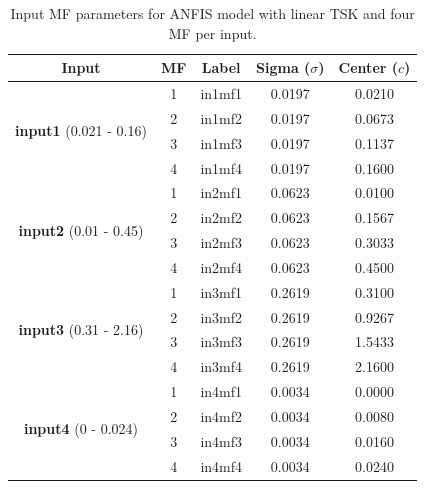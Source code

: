 \documentclass[12pt]{article}
\begin{document}
\begin{table}[H]
\centering
\begin{tabular}{|c|c|c|c|c|}
\hline
\textbf{Input} & \textbf{MF} & \textbf{Label} & \textbf{Sigma ($\sigma$)} & \textbf{Center ($c$)} \\ \hline
\multirow{4}{*}{\textbf{input1} (0.021 - 0.16)} 
 & 1 & in1mf1 & 0.0197 & 0.0210 \\ \cline{2-5} 
 & 2 & in1mf2 & 0.0197 & 0.0673 \\ \cline{2-5} 
 & 3 & in1mf3 & 0.0197 & 0.1137 \\ \cline{2-5} 
 & 4 & in1mf4 & 0.0197 & 0.1600 \\ \hline
\hline
\multirow{4}{*}{\textbf{input2} (0.01 - 0.45)} 
 & 1 & in2mf1 & 0.0623 & 0.0100 \\ \cline{2-5} 
 & 2 & in2mf2 & 0.0623 & 0.1567 \\ \cline{2-5} 
 & 3 & in2mf3 & 0.0623 & 0.3033 \\ \cline{2-5} 
 & 4 & in2mf4 & 0.0623 & 0.4500 \\ \hline
\hline
\multirow{4}{*}{\textbf{input3} (0.31 - 2.16)} 
 & 1 & in3mf1 & 0.2619 & 0.3100 \\ \cline{2-5} 
 & 2 & in3mf2 & 0.2619 & 0.9267 \\ \cline{2-5} 
 & 3 & in3mf3 & 0.2619 & 1.5433 \\ \cline{2-5} 
 & 4 & in3mf4 & 0.2619 & 2.1600 \\ \hline
\hline
\multirow{4}{*}{\textbf{input4} (0 - 0.024)} 
 & 1 & in4mf1 & 0.0034 & 0.0000 \\ \cline{2-5} 
 & 2 & in4mf2 & 0.0034 & 0.0080 \\ \cline{2-5} 
 & 3 & in4mf3 & 0.0034 & 0.0160 \\ \cline{2-5} 
 & 4 & in4mf4 & 0.0034 & 0.0240 \\ \hline
\end{tabular}
\caption{Input MF parameters for ANFIS model with linear TSK and four MF per input. }
\label{tab:starttables}
\end{table}
\end{document}
